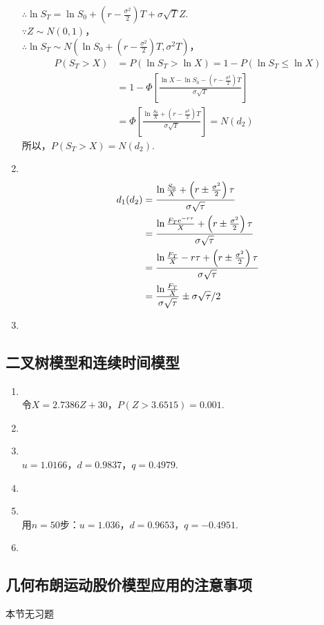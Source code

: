 \begin{enumerate}
    $\displaystyle \therefore \ln S_T = \ln S_0 + \left(r-\frac{\sigma^2}{2}\right)T+\sigma\sqrt{T}Z$.\\
    $\because Z \sim N(0, 1)$，\\
    $\displaystyle \therefore \ln S_T \sim N\left(\ln S_0 + \left(r-\frac{\sigma^2}{2}\right)T, \sigma^2T\right)$，
    \begin{align*}
        P(S_T > X) & = P(\ln S_T > \ln X) = 1-P(\ln S_T \leq \ln X)\\
        & = 1 - \Phi\left[\frac{\ln X - \ln S_0 - \left(r-\frac{\sigma^2}{2}\right)T}{\sigma\sqrt{T}}\right]\\
        & = \Phi\left[\frac{\ln \frac{S_0}{X} + \left(r-\frac{\sigma^2}{2}\right)T}{\sigma\sqrt{T}}\right] = N(d_2)
    \end{align*}
    所以，$P(S_T>X)=N(d_2)$.
    \item \pro\\
    \begin{align*}
        d_1(d_2) & = \frac{\ln \frac{S_0}{X} + \left(r\pm\frac{\sigma^2}{2}\right)\tau}{\sigma\sqrt{\tau}}\\
        & = \frac{\ln \frac{F_T\mathrm{e}^{-r\tau}}{X} + \left(r\pm\frac{\sigma^2}{2}\right)\tau}{\sigma\sqrt{\tau}}\\
        & = \frac{\ln \frac{F_T}{X} - r\tau + \left(r\pm\frac{\sigma^2}{2}\right)\tau}{\sigma\sqrt{\tau}}\\
        & = \frac{\ln \frac{F_T}{X}}{\sigma\sqrt{\tau}} \pm \sigma\sqrt{\tau}/2
    \end{align*}
    \item \omitted
\end{enumerate}
\subsection{二叉树模型和连续时间模型}
\begin{enumerate}
    \item \sol\\ 令$X=2.7386Z+30$，$P(Z>3.6515)=0.001$.
    \item \omitted
    \item \sol\\ $u=1.0166$，$d=0.9837$，$q=0.4979$.
    \item \omitted
    \item \sol\\ 用$n=50$步：$u=1.036$，$d=0.9653$，$q = -0.4951$.
    \item \omitted
\end{enumerate}
\subsection{几何布朗运动股价模型应用的注意事项}
本节无习题
\clearpage